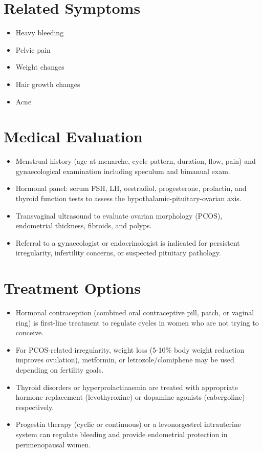 \section*{Related Symptoms}
\begin{itemize}
  \item Heavy bleeding
  \item Pelvic pain
  \item Weight changes
  \item Hair growth changes
  \item Acne
\end{itemize}

\section*{Medical Evaluation}
\begin{itemize}
  \item Menstrual history (age at menarche, cycle pattern, duration, flow, pain) and gynaecological examination including speculum and bimanual exam.
  \item Hormonal panel: serum FSH, LH, oestradiol, progesterone, prolactin, and thyroid function tests to assess the hypothalamic-pituitary-ovarian axis.
  \item Transvaginal ultrasound to evaluate ovarian morphology (PCOS), endometrial thickness, fibroids, and polyps.
  \item Referral to a gynaecologist or endocrinologist is indicated for persistent irregularity, infertility concerns, or suspected pituitary pathology.
\end{itemize}

\section*{Treatment Options}
\begin{itemize}
  \item Hormonal contraception (combined oral contraceptive pill, patch, or vaginal ring) is first-line treatment to regulate cycles in women who are not trying to conceive.
  \item For PCOS-related irregularity, weight loss (5-10\% body weight reduction improves ovulation), metformin, or letrozole/clomiphene may be used depending on fertility goals.
  \item Thyroid disorders or hyperprolactinaemia are treated with appropriate hormone replacement (levothyroxine) or dopamine agonists (cabergoline) respectively.
  \item Progestin therapy (cyclic or continuous) or a levonorgestrel intrauterine system can regulate bleeding and provide endometrial protection in perimenopausal women.
\end{itemize}

